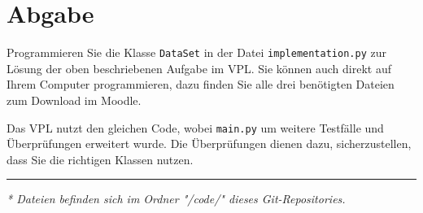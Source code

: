 \documentclass[12pt]{article}
\begin{document}
\section{Abgabe}
Programmieren Sie die Klasse \texttt{DataSet} in der Datei \texttt{implementation.py} zur Lösung der oben beschriebenen Aufgabe im VPL. Sie können auch direkt auf Ihrem Computer programmieren, dazu finden Sie alle drei benötigten Dateien zum Download im Moodle.

Das VPL nutzt den gleichen Code, wobei \texttt{main.py} um weitere Testfälle und Überprüfungen erweitert wurde. Die Überprüfungen dienen dazu, sicherzustellen, dass Sie die richtigen Klassen nutzen.

\vspace{1cm}
\hrule
\vspace{0.2cm}

\textit{* Dateien befinden sich im Ordner "/code/" dieses Git-Repositories.}
\end{document}
